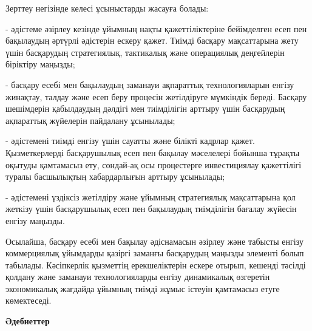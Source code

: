 \begin{multicols}{2}
Зерттеу негізінде келесі ұсыныстарды жасауға болады:

- әдістеме әзірлеу кезінде ұйымның нақты қажеттіліктеріне бейімделген
есеп пен бақылаудың әртүрлі әдістерін ескеру қажет. Тиімді басқару
мақсаттарына жету үшін басқарудың стратегиялық, тактикалық және
операциялық деңгейлерін біріктіру маңызды;

- басқару есебі мен бақылаудың заманауи ақпараттық технологияларын
енгізу жинақтау, талдау және есеп беру процесін жетілдіруге мүмкіндік
береді. Басқару шешімдерін қабылдаудың дәлдігі мен тиімділігін арттыру
үшін басқарудың ақпараттық жүйелерін пайдалану ұсынылады;

- әдістемені тиімді енгізу үшін сауатты және білікті кадрлар қажет.
Қызметкерлерді басқарушылық есеп пен бақылау мәселелері бойынша тұрақты
оқытуды қамтамасыз ету, сондай-ақ осы процестерге инвестициялау
қажеттілігі туралы басшылықтың хабардарлығын арттыру ұсынылады;

- әдістемені үздіксіз жетілдіру және ұйымның стратегиялық мақсаттарына
қол жеткізу үшін басқарушылық есеп пен бақылаудың тиімділігін бағалау
жүйесін енгізу маңызды.

Осылайша, басқару есебі мен бақылау әдіснамасын әзірлеу және табысты
енгізу коммерциялық ұйымдарды қазіргі заманғы басқарудың маңызды
элементі болып табылады. Кәсіпкерлік қызметтің ерекшеліктерін ескере
отырып, кешенді тәсілді қолдану және заманауи технологияларды енгізу
динамикалық өзгеретін экономикалық жағдайда ұйымның тиімді жұмыс істеуін
қамтамасыз етуге көмектеседі.
\end{multicols}

\begin{center}
	{\bfseries Әдебиеттер}
\end{center}

